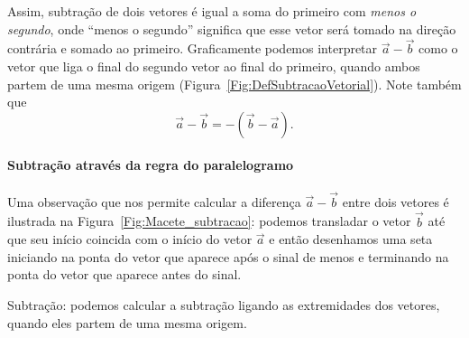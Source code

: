 Assim, subtração de dois vetores é igual a soma do primeiro com \emph{menos o segundo}, onde ``menos o segundo'' significa que esse vetor será tomado na direção contrária e somado ao primeiro. Graficamente podemos interpretar $\vec{a} - \vec{b}$ como o vetor que liga o final do segundo vetor ao final do primeiro, quando ambos partem de uma mesma origem (Figura~\ref{Fig:DefSubtracaoVetorial}). Note também que
\begin{equation}
    \vec{a} - \vec{b} = -(\vec{b}-\vec{a}).
\end{equation}

\paragraph{Subtração através da regra do paralelogramo}

Uma observação que nos permite calcular a diferença $\vec{a} - \vec{b}$ entre dois vetores é ilustrada na Figura~\ref{Fig:Macete_subtracao}: podemos transladar o vetor $\vec{b}$ até que seu início coincida com o início do vetor $\vec{a}$ e então desenhamos uma seta iniciando na ponta do vetor que aparece após o sinal de menos e terminando na ponta do vetor que aparece antes do sinal.

\begin{marginfigure}[-3cm]
\centering
{}
\caption{Subtração: podemos calcular a subtração ligando as extremidades dos vetores, quando eles partem de uma mesma origem.\label{Fig:Macete_subtracao}}
\end{marginfigure}

